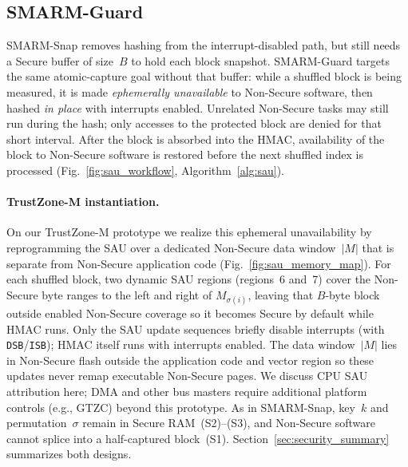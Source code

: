 \documentclass[conference]{IEEEtran}
\newcommand{\smarmcopy}{SMARM-Snap\xspace}
\newcommand{\smarmlock}{SMARM-Guard\xspace}
\begin{document}
\subsection{\smarmlock}
\label{sec:sau}

\smarmcopy{} removes hashing from the interrupt-disabled path, but still
needs a Secure buffer of size~$B$ to hold each block snapshot.
\smarmlock{} targets the same atomic-capture goal without that buffer:
while a shuffled block is being measured, it is made
\emph{ephemerally unavailable} to Non-Secure software, then hashed
\emph{in place} with interrupts enabled.
Unrelated Non-Secure tasks may still run during the hash; only accesses
to the protected block are denied for that short interval.
After the block is absorbed into the HMAC, availability of the block to
Non-Secure software is restored before the next shuffled index is
processed
(Fig.~\ref{fig:sau_workflow}, Algorithm~\ref{alg:sau}).

\paragraph{TrustZone-M instantiation.}
On our TrustZone-M prototype we realize this ephemeral unavailability by
reprogramming the SAU over a dedicated Non-Secure data window~$|M|$
that is separate from Non-Secure application code
(Fig.~\ref{fig:sau_memory_map}).
For each shuffled block, two dynamic SAU regions (regions~6 and~7)
cover the Non-Secure byte ranges to the left and right of
$M_{\sigma(i)}$, leaving that $B$-byte block outside enabled Non-Secure
coverage so it becomes Secure by default while HMAC runs.
Only the SAU update sequences briefly disable interrupts (with
\texttt{DSB}/\texttt{ISB}); HMAC itself runs with interrupts enabled.
The data window~$|M|$ lies in Non-Secure flash outside the application
code and vector region so these updates never remap executable
Non-Secure pages.
We discuss CPU SAU attribution here; DMA and other bus masters require
additional platform controls (e.g., GTZC) beyond this prototype.
As in \smarmcopy{}, key~$k$ and permutation~$\sigma$ remain in Secure
RAM~(S2)--(S3), and Non-Secure software cannot splice into a
half-captured block~(S1).
Section~\ref{sec:security_summary} summarizes both designs.
\end{document}
